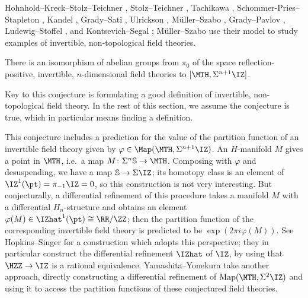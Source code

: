 Hohnhold--Kreck--Stolz--Teichner \cite[\S 5.2]{HKST11},
Stolz--Teichner \cite{ST11},
Tachikawa \cite[\S 1]{Tac13},
Schommer-Pries--Stapleton \cite[\S 7]{SS14},
Kandel \cite{Kan16},
Grady--Sati \cite[\S 5.2]{GS17},
Ulrickson \cite[\S 2.1.2]{Ulr17},
Müller--Szabo \cite[\S 2.1]{MS18},
Grady--Pavlov \cite[\S 4.2]{GP20},
Ludewig--Stoffel \cite[\S 3]{LS20}, and
Kontsevich--Segal \cite{KS21}; Müller--Szabo use their model to study examples of invertible,
non-topological field theories.
\begin{conjecture}
\label{nontopinv}
	There is an isomorphism of abelian groups from $\pi_0$ of the space reflection-positive, invertible,
	$n$-dimensional field theories to $[\MTH, \Sigma^{n+1}\IZ]$.
\end{conjecture}
Key to this conjecture is formulating a good definition of invertible, non-topological field theory. In the rest of
this section, we assume the conjecture is true, which in particular means finding a definition.

This conjecture includes a prediction for the value of the partition function of an invertible field theory given
by $\varphi\in\Map(\MTH, \Sigma^{n+1}\IZ)$. An $H$-manifold $M$ gives a point in $\MTH$, i.e.\ a map
$M\colon \Sigma^n\mathbb S\to\MTH$. Composing with $\varphi$ and desuspending, we have a map $\mathbb
S\to\Sigma\IZ$; its homotopy class is an element of $\IZ^1(\pt) = \pi_{-1}\IZ = 0$, so this construction is not
very interesting. But conjecturally, a differential refinement of this procedure takes a manifold $M$ with a
differential $H_n$-structure and obtains an element $\varphi(M)\in \IZhat^1(\pt)\cong\RR/\ZZ$; then the partition
function of the corresponding invertible field theory is predicted to be $\exp(2\pi i\varphi(M))$. See
Hopkins--Singer \cite[\S 5.1]{HopkinsSinger} for a construction which adopts this perspective; they in particular
construct the differential refinement $\IZhat$ of $\IZ$, by using that $\HZZ\to\IZ$ is a rational equivalence.
Yamashita--Yonekura \cite{YY21} take another approach, directly constructing a differential refinement of
$\mathrm{Map}(\MTH, \Sigma^2\IZ)$ and using it to access the partition functions of these conjectured field
theories.

